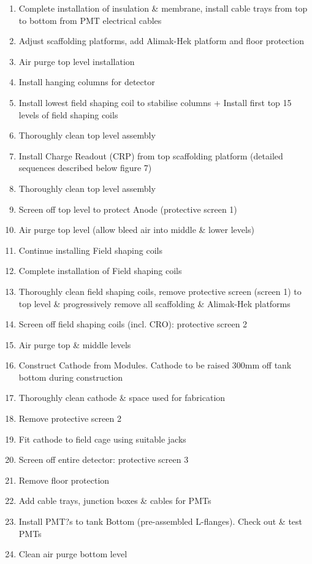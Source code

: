 \begin{enumerate}
\item{Complete installation of insulation \& membrane, install cable trays from top to bottom from PMT electrical cables}
\item{Adjust scaffolding platforms, add Alimak-Hek platform and floor protection}
\item{Air purge top level installation}
\item{Install hanging columns for detector}
\item{Install lowest field shaping coil to stabilise columns + Install first top 15 levels of field shaping coils}
\item{Thoroughly clean top level assembly}
\item{Install Charge Readout (CRP) from top scaffolding platform (detailed sequences described below figure 7)}
\item{Thoroughly clean top level assembly}
\item{Screen off top level to protect Anode (protective screen 1)}
\item{Air purge top level (allow bleed air into middle \& lower levels)}
\item{Continue installing Field shaping coils}
\item{Complete installation of Field shaping coils}
\item{Thoroughly clean field shaping coils, remove protective screen (screen 1) to top level \& progressively remove all scaffolding \& Alimak-Hek platforms}
\item{Screen off field shaping coils (incl. CRO): protective screen 2}
\item{Air purge top \& middle levels}
\item{Construct Cathode from Modules. Cathode to be raised 300mm off tank bottom during construction}
\item{Thoroughly clean cathode \& space used for fabrication}
\item{Remove protective screen 2}
\item{Fit cathode to field cage using suitable jacks}
\item{Screen off entire detector: protective screen 3}
\item{Remove floor protection}
\item{Add cable trays, junction boxes \& cables for PMTs}
\item{Install PMT?s to tank Bottom (pre-assembled L-flanges). Check out \& test PMTs}
\item{Clean air purge bottom level}

\end{enumerate}
